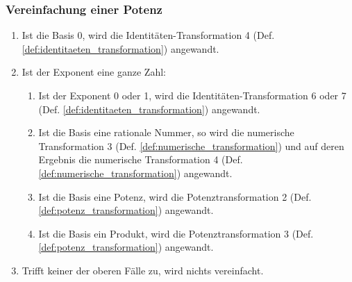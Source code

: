 \documentclass[11pt]{article}
\newcommand{\lab}[1]{(Def. \ref{#1})}
\begin{document}
\subsubsection{Vereinfachung einer Potenz}
\begin{enumerate}
  \item Ist die Basis 0, wird die Identitäten-Transformation 4 \lab{def:identitaeten_transformation} angewandt.
  \item Ist der Exponent eine ganze Zahl:
        \begin{enumerate}
          \item Ist der Exponent 0 oder 1, wird die Identitäten-Transformation 6 oder 7 
                \lab{def:identitaeten_transformation} angewandt.
          \item Ist die Basis eine rationale Nummer, so wird die numerische Transformation 3 
                \lab{def:numerische_transformation} und auf deren Ergebnis die numerische 
                Transformation 4 \lab{def:numerische_transformation} angewandt.
          \item Ist die Basis eine Potenz, wird die Potenztransformation 2 \lab{def:potenz_transformation} angewandt.
          \item Ist die Basis ein Produkt, wird die Potenztransformation 3 \lab{def:potenz_transformation} angewandt.
        \end{enumerate}
  \item Trifft keiner der oberen Fälle zu, wird nichts vereinfacht.
\end{enumerate}
\end{document}
